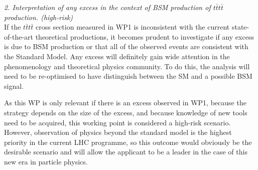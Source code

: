 \noindent\textit{2. Interpretation of any excess in the context of BSM production of $t\bar{t}t\bar{t}$ production. (high-risk)}\\

If the $t\bar{t}t\bar{t}$ cross section measured in WP1 is inconsistent with the current state-of-the-art theoretical productions, it becomes prudent to investigate if any excess is due to BSM production or that all of the observed events are consistent with the Standard Model. Any excess will definitely gain wide attention in the phenomenology and theoretical physics community. To do this, the analysis will need to be re-optimised to have distinguish between the SM and a possible BSM signal. 

As this WP is only relevant if there is an excess observed in WP1, because the strategy depends on the size of the excess, and because knowledge of new tools need to be acquired, this working point is considered a high-risk scenario.  However, observation of physics beyond the standard model is the highest priority in the current LHC programme, so this outcome would obviously be the desirable scenario and will allow the applicant to be a leader in the case of this new era in particle physics.

